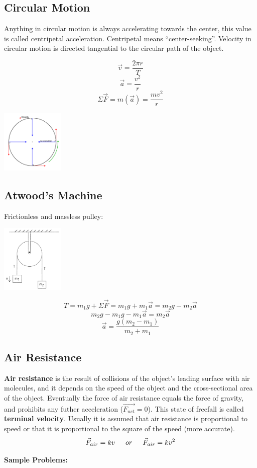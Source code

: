 \documentclass{article}
\begin{document}
\subsection{Circular Motion}
Anything in circular motion is always accelerating towards the center, this value is called centripetal acceleration. Centripetal means ``center-seeking''. Velocity in circular motion is directed tangential to the circular path of the object.

\begin{multicols}{2}
\[\vec{v}=\frac{2\pi r}{T}\]
\[\vec{a}=\frac{v^2}{r}\]
\[\Sigma\vec{F}=m(\vec{a})=\frac{mv^2}{r}\]
\columnbreak
\centerline{\includegraphics[width=3cm]{circularMotion.png}}
\end{multicols}

\subsection{Atwood's Machine}
Frictionless and massless pulley:

\begin{multicols}{2}
\centerline{\includegraphics[width=3cm]{atwood.png}}
\columnbreak
\[T=m_1g+\Sigma\vec{F}=m_1g+m_1\vec{a}=m_2g-m_2\vec{a}\]
\[m_2g-m_1g-m_1\vec{a}=m_2\vec{a}\]
\[\vec{a}=\frac{g(m_2-m_1)}{m_2+m_1}\]
\end{multicols}

\subsection{Air Resistance}
\textbf{Air resistance} is the result of collisions of the object's leading surface with air molecules, and it depends on the speed of the object and the cross-sectional area of the object. Eventually the force of air resistance equals the force of gravity, and prohibits any futher acceleration ($\vec{F_{net}}=0$). This state of freefall is called \textbf{terminal velocity}. Usually it is assumed that air resistance is proportional to speed or that it is proportional to the square of the speed (more accurate).
\[\vec{F}_{air}=kv \indent or \indent \vec{F}_{air}=kv^2\]

\textbf{Sample Problems:}
\end{document}
